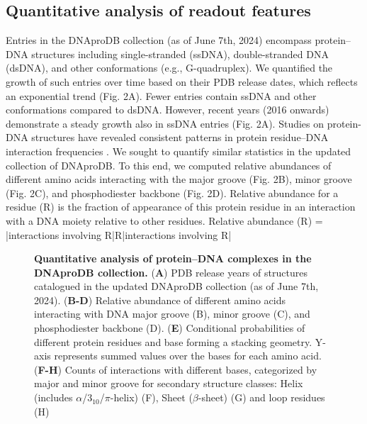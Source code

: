 \subsection{Quantitative analysis of readout features}
Entries in the DNAproDB collection (as of June 7th, 2024) encompass protein–DNA structures including single-stranded (ssDNA), double-stranded DNA (dsDNA), and other conformations (e.g., G-quadruplex). We quantified the growth of such entries over time based on their PDB release dates, which reflects an exponential trend (Fig. 2A). Fewer entries contain ssDNA and other conformations compared to dsDNA. However, recent years (2016 onwards) demonstrate a steady growth also in ssDNA entries (Fig. 2A). 
Studies on protein-DNA structures have revealed consistent patterns in protein residue–DNA interaction frequencies \citep{rohs2009role, Lin2019}. We sought to quantify similar statistics in the updated collection of DNAproDB. To this end, we computed relative abundances of different amino acids interacting with the major groove (Fig. 2B), minor groove (Fig. 2C), and phosphodiester backbone (Fig. 2D). Relative abundance for a residue (R) is the fraction of appearance of this protein residue in an interaction with a DNA moiety relative to other residues. 
Relative abundance (R) = |interactions involving R|R|interactions involving R|

\begin{center}
    \begin{figure}
        \caption[Quantitative analysis of protein–DNA complexes in the DNAproDB collection. ]{\textbf{Quantitative analysis of protein–DNA complexes in the DNAproDB collection. } ({\bf A}) PDB release years of structures catalogued in the updated DNAproDB collection (as of June 7th, 2024). ({\bf B-D})   Relative abundance of different amino acids interacting with DNA major groove (B), minor groove (C), and phosphodiester backbone (D). ({\bf E}) Conditional probabilities of different protein residues and base forming a stacking geometry. Y-axis represents summed values over the bases for each amino acid.({\bf F-H}) Counts of interactions with different bases, categorized by major and minor groove for secondary structure classes: Helix (includes $\alpha$/$3_{10}$/$\pi$-helix) (F), Sheet ($\beta$-sheet) (G) and loop residues (H) }
  \label{fig:dnaprodb2}
\end{figure}
\end{center}

